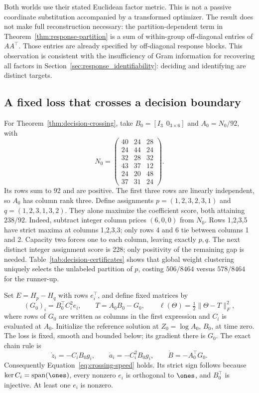 Both worlds use their stated Euclidean factor metric. This is not a
passive coordinate substitution accompanied by a transformed optimizer.
The result does not make full reconstruction necessary: the
partition-dependent term in Theorem~\ref{thm:response-partition} is a
sum of within-group off-diagonal entries of $AA^\top$. Those entries
are already specified by off-diagonal response blocks. This observation
is consistent with the insufficiency of Gram information for recovering
all factors in Section~\ref{sec:response_identifiability}: deciding and
identifying are distinct targets.



\subsection{A fixed loss that crosses a decision boundary}
\label{app:decision-crossing-proof}

For Theorem~\ref{thm:decision-crossing}, take $B_0=[I_3\ \ 0_{3\times6}]$
and $A_0=N_0/92$, with
\begin{equation}
 N_0=\begin{pmatrix}
 40&24&28\\24&44&24\\32&28&32\\43&37&12\\24&20&48\\37&31&24
 \end{pmatrix}. \label{eq:crossing-counter-matrix}
\end{equation}
Its rows sum to 92 and are positive. The first three rows are linearly
independent, so $A_0$ has column rank three. Define assignments
$p=(1,2,3,2,3,1)$ and $q=(1,2,3,1,3,2)$. They alone maximize the
coefficient score, both attaining $238/92$. Indeed, subtract integer
column prices $(6,0,0)$ from $N_0$. Rows 1,2,3,5 have strict maxima at
columns 1,2,3,3; only rows 4 and 6 tie between columns 1 and 2. Capacity
two forces one to each column, leaving exactly $p,q$. The next distinct
integer assignment score is 228; only positivity of the remaining gap
is needed. Table~\ref{tab:decision-certificates} shows that global weight
clustering uniquely selects the unlabeled partition of $p$, costing
$506/8464$ versus $578/8464$ for the runner-up.

Set $E=H_p-H_q$ with rows $e_i^\top$, and define fixed matrices by
\begin{equation}
 (G_0)_i=B_0^\top C_i^2e_i,\qquad
 T=A_0B_0-G_0,\qquad
 \ell(\Theta)=\tfrac12\|\Theta-T\|_F^2, \label{eq:crossing-target}
\end{equation}
where rows of $G_0$ are written as columns in the first expression and
$C_i$ is evaluated at $A_0$. Initialize the reference solution at
$Z_0=\log A_0$, $B_0$, at time zero. The loss is fixed, smooth and
bounded below; its gradient there is $G_0$. The exact chain rule is
\[
 \dot z_i=-C_iB_0g_i,\qquad
 \dot a_i=-C_i^2B_0g_i,\qquad
 \dot B=-A_0^\top G_0.
\]
Consequently Equation~\eqref{eq:crossing-speed} holds. Its strict sign
follows because $\ker C_i=\operatorname{span}(\ones)$, every nonzero
$e_i$ is orthogonal to $\ones$, and $B_0^\top$ is injective. At least
one $e_i$ is nonzero.

